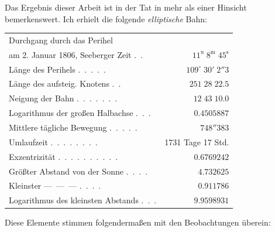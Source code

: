 \par\indent Das Ergebnis dieser Arbeit ist in der Tat in mehr als einer Hinsicht bemerkenswert. Ich erhielt die folgende \emph{elliptische} Bahn:

\begin{center}\begingroup
\fontsize{9}{11}\selectfont
\setlength{\tabcolsep}{2pt}\renewcommand{\arraystretch}{1.12}
\begin{tabular}{lr}
\multicolumn{2}{l}{Durchgang durch das Perihel} \\
\quad am 2. Januar 1806, Seeberger Zeit .\ . & $11^{\mathrm{u}}\;8^{\mathrm{m}}\;45^{\mathrm{s}}$ \\
Länge des Perihels .\ .\ .\ .\ . & $109^\circ\;30'\;2''3$ \\
Länge des aufsteig. Knotens .\ . & $251\;28\;22.5$ \\
Neigung der Bahn .\ .\ .\ .\ .\ .\ . & $12\;43\;10.0$ \\
Logarithmus der großen Halbachse .\ .\ . & $0.4505887$ \\
Mittlere tägliche Bewegung .\ .\ .\ .\ . & $748''383$ \\
Umlaufzeit .\ .\ .\ .\ .\ .\ .\ . & 1731 Tage 17 Std. \\
Exzentrizität .\ .\ .\ .\ .\ .\ .\ .\ .\ . & $0.6769242$ \\
Größter Abstand von der Sonne .\ .\ .\ . & $4.732625$ \\
Kleinster \quad---\ ---\ --- .\ .\ .\ . & $0.911786$ \\
Logarithmus des kleinsten Abstands .\ .\ . & $9.9598931$ \\
\end{tabular}\endgroup\end{center}

\par\indent Diese Elemente stimmen folgendermaßen mit den Beobachtungen überein:

